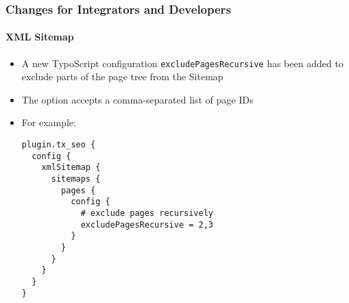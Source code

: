 %

\begin{frame}[fragile]
	\frametitle{Changes for Integrators and Developers}
	\framesubtitle{XML Sitemap}


	\begin{itemize}
		\item A new TypoScript configuration \texttt{excludePagesRecursive}
			has been added to exclude parts of the page tree from the Sitemap
		\item The option accepts a comma-separated list of page IDs
		\item For example:
\begin{lstlisting}
plugin.tx_seo {
  config {
    xmlSitemap {
      sitemaps {
        pages {
          config {
            # exclude pages recursively
            excludePagesRecursive = 2,3
          }
        }
      }
    }
  }
}
\end{lstlisting}

	\end{itemize}

\end{frame}

